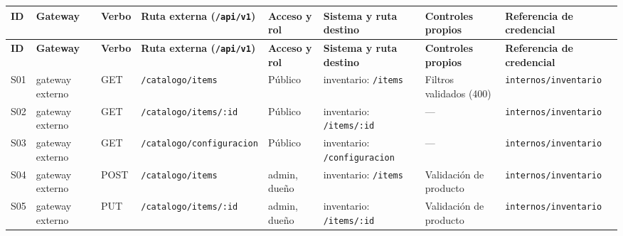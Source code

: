 \begin{landscape}
\vspace{0.6em}
{\scriptsize
\setlength{\LTpre}{0pt}\setlength{\LTpost}{0pt}
\setlength{\tabcolsep}{3pt}\renewcommand{\arraystretch}{1.15}
\begin{longtable}{|>{\raggedright\arraybackslash}p{}|>{\raggedright\arraybackslash}p{}|>{\raggedright\arraybackslash}p{}|>{\raggedright\arraybackslash}p{}|>{\raggedright\arraybackslash}p{}|>{\raggedright\arraybackslash}p{}|>{\raggedright\arraybackslash}p{}|>{\raggedright\arraybackslash}p{}|}
\hline
\textbf{ID} & \textbf{Gateway} & \textbf{Verbo} & \textbf{Ruta externa (\texttt{/\allowbreak{}api/\allowbreak{}v1})} & \textbf{Acceso y rol} & \textbf{Sistema y ruta destino} & \textbf{Controles propios} & \textbf{Referencia de credencial} \\ \hline
\endfirsthead
\hline
\textbf{ID} & \textbf{Gateway} & \textbf{Verbo} & \textbf{Ruta externa (\texttt{/\allowbreak{}api/\allowbreak{}v1})} & \textbf{Acceso y rol} & \textbf{Sistema y ruta destino} & \textbf{Controles propios} & \textbf{Referencia de credencial} \\ \hline
\endhead
S01 & gateway externo & GET & \texttt{/\allowbreak{}catalogo/\allowbreak{}items} & Público & inventario: \texttt{/\allowbreak{}items} & Filtros validados (400) & \texttt{internos/\allowbreak{}inventario} \\ \hline
S02 & gateway externo & GET & \texttt{/\allowbreak{}catalogo/\allowbreak{}items/\allowbreak{}:\allowbreak{}id} & Público & inventario: \texttt{/\allowbreak{}items/\allowbreak{}:\allowbreak{}id} & — & \texttt{internos/\allowbreak{}inventario} \\ \hline
S03 & gateway externo & GET & \texttt{/\allowbreak{}catalogo/\allowbreak{}configuracion} & Público & inventario: \texttt{/\allowbreak{}configuracion} & — & \texttt{internos/\allowbreak{}inventario} \\ \hline
S04 & gateway externo & POST & \texttt{/\allowbreak{}catalogo/\allowbreak{}items} & admin, dueño & inventario: \texttt{/\allowbreak{}items} & Validación de producto & \texttt{internos/\allowbreak{}inventario} \\ \hline
S05 & gateway externo & PUT & \texttt{/\allowbreak{}catalogo/\allowbreak{}items/\allowbreak{}:\allowbreak{}id} & admin, dueño & inventario: \texttt{/\allowbreak{}items/\allowbreak{}:\allowbreak{}id} & Validación de producto & \texttt{internos/\allowbreak{}inventario} \\ \hline

\end{longtable}}
\end{landscape}
